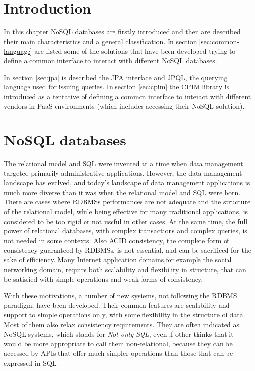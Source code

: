 \section{Introduction}
In this chapter NoSQL databases are firstly introduced and then are described their main characteristics and a general classification. In section \ref{sec:common-language} are listed some of the solutions that have been developed trying to define a common interface to interact with different NoSQL databases.

\noindent In section \ref{sec:jpa} is described the JPA interface and JPQL, the querying language used for issuing queries. In section \ref{sec:cpim} the CPIM library is introduced as a tentative of defining a common interface to interact with different vendors in PaaS environments (which includes accessing their NoSQL solution).

\section{NoSQL databases}
\label{sec:nosql}
The relational model and SQL were invented at a time when data management targeted primarily administrative applications. However, the data management landscape has evolved, and today's landscape of data management applications is much more diverse than it was when the relational model and SQL were born.
There are cases where RDBMSs performances are not adequate and the structure of the relational model, while being effective for many traditional applications, is considered to be too rigid or not useful in other cases.
At the same time, the full power of relational databases, with complex transactions and complex queries, is not needed in some contexts. Also ACID consistency, the complete form of consistency guaranteed by RDBMSs, is not essential, and can be sacrificed for the sake of efficiency. 
Many Internet application domains,for example the social networking domain, require both scalability and flexibility in structure, that can be satisfied with simple operations and weak forms of consistency.

\newparagraph With these motivations, a number of new systems, not following the RDBMS paradigm, have been developed. Their common features are scalability and support to simple operations only, with some flexibility in the structure of data. Most of them also relax consistency requirements. They are often indicated as NoSQL systems, which stands for \textit{Not only SQL}, even if other thinks that it would be more appropriate to call them non-relational,  because they can be accessed by APIs that offer much simpler operations than those that can be expressed in SQL. 

